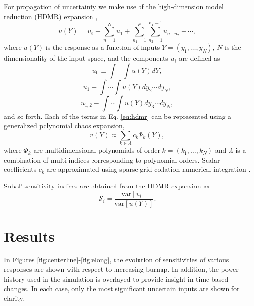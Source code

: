 \documentclass{anstrans} \usepackage{amsmath} \usepackage{amssymb}
\begin{document}
For propagation of uncertainty we make use of the high-dimension model reduction (HDMR) expansion \cite{hdmr},
\begin{equation}\label{eq:hdmr}
  u(Y) = u_0 + \sum_{n=1}^N u_1 + \sum_{n_1=1}^N\sum_{n_2=1}^{n_1-1} u_{n_1,n_2} + \cdots,
\end{equation}
where $u(Y)$ is the response as a function of inputs $Y=(y_1,\ldots,y_N)$, $N$ is the dimensionality of the
input space, and the components $u_i$ are defined as
\begin{equation}
  u_0 \equiv \int\cdots\int u(Y) dY,
\end{equation}
\vspace{-10pt}
\begin{equation}
  u_1 \equiv \int\cdots\int u(Y) dy_2\cdots dy_N,
\end{equation}
\vspace{-10pt}
\begin{equation}
  u_{1,2} \equiv \int\cdots\int u(Y) dy_3\cdots dy_N,
\end{equation}
and so forth.  Each of the terms in Eq. \ref{eq:hdmr} can be represented using a generalized polynomial chaos
expansion,
\begin{equation}
  u(Y) \approx \sum_{k\in\Lambda}c_k\Phi_k(Y),
\end{equation}
where $\Phi_k$ are multidimensional polynomials of order $k=(k_1,\ldots,k_N)$ and $\Lambda$ is a combination
of multi-indices corresponding to polynomial orders.  Scalar coefficients $c_k$ are approximated using
sparse-grid collation numerical integration \cite{smolyak}.

Sobol' sensitivity indices are obtained from the HDMR expansion as
\begin{equation}
  \mathcal{S}_i = \frac{\text{var}[u_i]}{\text{var}[u(Y)]}.
\end{equation}

\section{Results}\label{results}
In Figures \ref{fig:centerline}-\ref{fig:elong}, the evolution of sensitivities of various responses are shown
with respect to increasing burnup.  In addition, the power history used in the simulation is overlayed to
provide insight in time-based changes.  In each case, only the most significant uncertain inputs are shown
for clarity.
\end{document}
